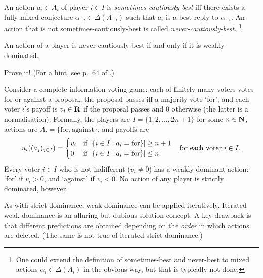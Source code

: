 \begin{definition}
	\label{definition:sbr_cautious}
	An action $a_i \in A_i$ of player $i \in I$ is \emph{sometimes-cautiously-best} iff there exists a fully mixed conjecture $\alpha_{-i} \in \Delta(A_{-i})$ such that $a_i$ is a best reply to $\alpha_{-i}$. An action that is not sometimes-cautiously-best is called \emph{never-cautiously-best.}%
		\footnote{One could extend the definition of sometimes-best and never-best to mixed actions $\alpha_i \in \Delta(A_i)$ in the obvious way, but that is typically not done.}
\end{definition}

\begin{namedthm}
	\label{lemma:pearce_cautious}
	An action of a player is never-cautiously-best if and only if it is weakly dominated.
\end{namedthm}

\begin{exercise}
	\label{exercise:pearce_cautious_pf}
	Prove it! (For a hint, see p.~64 of \textcite{OsborneRubinstein1994}.)
\end{exercise}

\begin{example}
	\label{example:voting}
	Consider a complete-information voting game: each of finitely many voters votes for or against a proposal, the proposal passes iff a majority vote `for', and each voter $i$'s payoff is $v_i \in \mathbf{R}$ if the proposal passes and $0$ otherwise (the latter is a normalisation).
	Formally, the players are $I = \{1,2,\dots,2n+1\}$ for some $n \in \mathbf{N}$, actions are $A_i = \{ \text{for}, \text{against} \}$, and payoffs are
	\begin{equation*}
		u_i((a_j)_{j \in I})
		=
		\begin{cases}
			v_i & \text{if $\abs*{\left\{ i \in I : a_i = \text{for} \right\}} \geq n+1$} \\
			0 & \text{if $\abs*{\left\{ i \in I : a_i = \text{for} \right\}} \leq n$}
		\end{cases}
		\quad \text{for each voter $i \in I$.}
	\end{equation*}
	Every voter $i \in I$ who is not indifferent ($v_i \neq 0$) has a weakly dominant action: `for' if $v_i>0$, and `against' if $v_i<0$. No action of any player is strictly dominated, however.
\end{example}

As with strict dominance, weak dominance can be applied iteratively. Iterated weak dominance is an alluring but dubious solution concept. A key drawback is that different predictions are obtained depending on the \emph{order} in which actions are deleted. (The same is not true of iterated strict dominance.)

